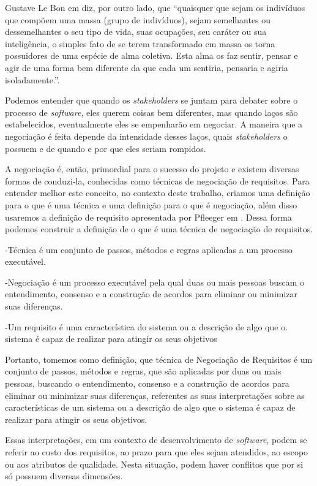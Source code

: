 Gustave Le Bon em \cite{lebon1954} diz, por outro lado, que ``quaisquer que
sejam os indivíduos que compõem uma massa (grupo de indivíduos), sejam semelhantes ou dessemelhantes o seu tipo de vida, suas
ocupações, seu caráter ou sua inteligência, o simples fato de se terem
transformado em massa os torna possuidores de uma espécie de alma coletiva. Esta
alma os faz sentir, pensar e agir de uma forma bem diferente da que cada um sentiria, pensaria e agiria isoladamente.''.

Podemos entender que quando os \textit{stakeholders} se juntam para debater
sobre o processo de \textit{software}, eles querem coisas bem diferentes, mas
quando laços são estabelecidos, eventualmente eles se empenharão em negociar. A maneira que a
negociação é feita depende da intensidade desses laços, quais
\textit{stakeholders} o possuem e de quando e por que eles seriam rompidos.

 A negociação é, então, primordial para o sucesso do projeto e existem diversas
 formas de conduzi-la, conhecidas como técnicas de negociação de requisitos.
 Para entender melhor este conceito, no contexto deste trabalho, criamos uma
 definição para o que é uma técnica e uma definição para o que é negociação,
 além disso usaremos a definição de requisito apresentada por Pfleeger
 em \cite{Pfleeger:2004:SET:517000}. Dessa forma podemos construir a definição
 de o que é uma técnica de negociação de requisitos.

-Técnica é um conjunto de
passos, métodos e regras aplicadas a um processo executável.

-Negociação é um processo executável pela qual duas ou mais pessoas buscam o
entendimento, consenso e a construção de acordos para eliminar ou minimizar suas diferenças.

-Um requisito é uma característica do sistema ou a descrição de algo que o.
sistema é capaz de realizar para atingir os seus objetivos

Portanto, tomemos como definição, que técnica de Negociação
de Requisitos é um conjunto de passos, métodos e regras, que são aplicadas por
duas ou mais pessoas, buscando o entendimento, consenso e a construção de
acordos para eliminar ou minimizar suas diferenças, referentes as suas interpretações sobre as características de um sistema ou a descrição de algo que o sistema é capaz de realizar para atingir os seus objetivos.

Essas interpretações, em um contexto de desenvolvimento de \textit{software},
podem se referir ao custo dos requisitos, ao prazo para que eles sejam atendidos, ao
escopo ou aos atributos de qualidade. Nesta situação, podem haver conflitos que
por si só possuem diversas dimensões.

